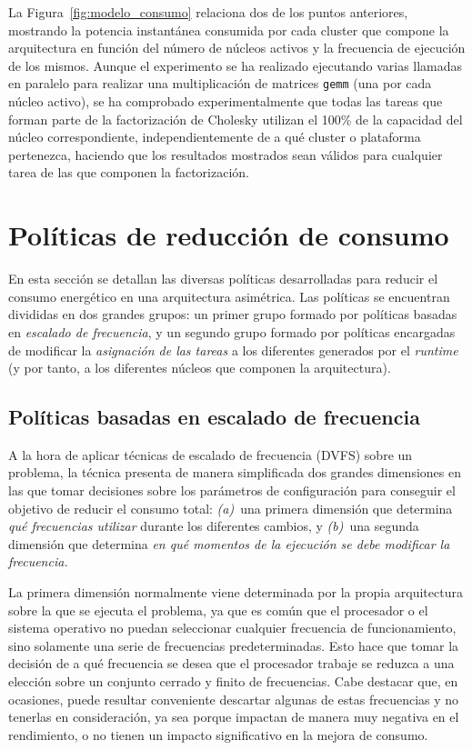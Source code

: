 La Figura~\ref{fig:modelo_consumo} relaciona dos de los puntos anteriores,
mostrando la potencia instantánea consumida por cada cluster que compone la
arquitectura en función del número de núcleos activos y la frecuencia de
ejecución de los mismos. Aunque el experimento se ha realizado ejecutando
varias llamadas en paralelo para realizar una multiplicación de matrices
\texttt{gemm} (una por cada núcleo activo), se ha comprobado
experimentalmente que todas las tareas que forman parte de la factorización
de Cholesky utilizan el 100\% de la capacidad del núcleo correspondiente,
independientemente de a qué cluster o plataforma pertenezca, haciendo que
los resultados mostrados sean válidos para cualquier tarea de las que
componen la factorización.  









\section{Políticas de reducción de consumo}
En esta sección se detallan las diversas políticas desarrolladas para
reducir el consumo energético en una arquitectura asimétrica. Las políticas
se encuentran divididas en dos grandes grupos: un primer grupo formado por
políticas basadas en {\em escalado de frecuencia}, y un segundo grupo
formado por políticas encargadas de modificar la {\em asignación de las
  tareas} a los diferentes \wts generados por el \emph{runtime} (y por
tanto, a los diferentes núcleos que componen la arquitectura).

\subsection[{Políticas basadas en escalado de frecuencia (P1, P2, P2' y P3)}]{Políticas basadas en escalado de frecuencia}

A la hora de aplicar técnicas de escalado de frecuencia (DVFS) sobre un
problema, la técnica presenta de manera simplificada dos grandes
dimensiones en las que tomar decisiones sobre los parámetros de
configuración para conseguir el objetivo de reducir el consumo total: {\em
  (a)}~una primera dimensión que determina {\em qué frecuencias utilizar}
durante los diferentes cambios, y {\em (b)}~una segunda dimensión que
determina \emph{en qué momentos de la ejecución se debe modificar la
  frecuencia.}

La primera dimensión normalmente viene determinada por la propia
arquitectura sobre la que se ejecuta el problema, ya que es común que el
procesador o el sistema operativo no puedan seleccionar cualquier
frecuencia de funcionamiento, sino solamente una serie de frecuencias
predeterminadas. Esto hace que tomar la decisión de a qué frecuencia se
desea que el procesador trabaje se reduzca a una elección sobre un conjunto
cerrado y finito de frecuencias. Cabe destacar que, en ocasiones, puede
resultar conveniente descartar algunas de estas frecuencias y no tenerlas
en consideración, ya sea porque impactan de manera muy negativa en el
rendimiento, o no tienen un impacto significativo en la mejora de
consumo.

